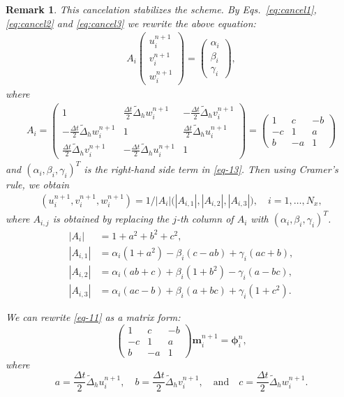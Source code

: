 \documentclass[preprint,times,3p]{elsarticle}
\newtheorem{remark}{Remark}
\begin{document}
\begin{remark}
This cancelation stabilizes the scheme. By Eqs.~\eqref{eq:cancel1}, \eqref{eq:cancel2} and \eqref{eq:cancel3} we rewrite the above equation:
\begin{align}
A_i \begin{pmatrix}
u_i^{n+1} \\
v_i^{n+1} \\
w_i^{n+1}
\end{pmatrix}
= \begin{pmatrix}
\alpha_i \\
\beta_i \\
\gamma_i
\end{pmatrix},
\end{align}
where
\begin{align}
A_i = 
\begin{pmatrix}
1 & \frac{\Delta t}{2} \tilde{\Delta}_h w_i^{n+1} & -\frac{\Delta t}{2} \tilde{\Delta}_h v_i^{n+1} \\
-\frac{\Delta t}{2} \tilde{\Delta}_h w_i^{n+1} & 1 & \frac{\Delta t}{2} \tilde{\Delta}_h u_i^{n+1} \\
\frac{\Delta t}{2} \tilde{\Delta}_h v_i^{n+1} & -\frac{\Delta t}{2} \tilde{\Delta}_h u_i^{n+1} & 1
\end{pmatrix}
=
\begin{pmatrix}
1 & c & -b \\
-c & 1 & a \\
b & -a & 1
\end{pmatrix}
\end{align}
and \((\alpha_i, \beta_i, \gamma_i)^T\) is the right-hand side term in \cref{eq-13}. Then using Cramer's rule, we obtain
\begin{align}
(u_i^{n+1}, v_i^{n+1}, w_i^{n+1}) = 1/|A_i| \bigl(|A_{i,1}|, |A_{i,2}|, |A_{i,3}|\bigr), \quad i = 1, \dots, N_x,
\end{align}
where \(A_{i,j}\) is obtained by replacing the \(j\)-th column of \(A_i\) with \((\alpha_i, \beta_i, \gamma_i)^T\).
\begin{align*}
|A_i| &= 1 + a^2 + b^2 + c^2, \\
|A_{i,1}| &= \alpha_i(1 + a^2) - \beta_i(c - ab) + \gamma_i(ac + b), \\
|A_{i,2}| &= \alpha_i(ab + c) + \beta_i(1 + b^2) - \gamma_i(a - bc), \\
|A_{i,3}| &= \alpha_i(ac - b) + \beta_i(a + bc) + \gamma_i(1 + c^2).
\end{align*}

We can rewrite \cref{eq-11} as a matrix form:
\[
\begin{pmatrix}
1 & c & -b \\
-c & 1 & a \\
b & -a & 1
\end{pmatrix}
\mathbf{m}_i^{n+1} = \boldsymbol{\phi}_i^n,
\]
where
\[
a = \frac{\Delta t}{2} \tilde{\Delta}_h u_i^{n+1}, \quad
b = \frac{\Delta t}{2} \tilde{\Delta}_h v_i^{n+1}, \quad \text{and} \quad
c = \frac{\Delta t}{2} \tilde{\Delta}_h w_i^{n+1}.
\]


\end{remark}
\end{document}
